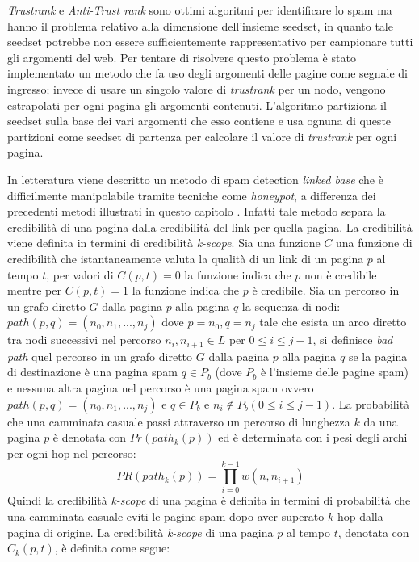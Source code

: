 \textit{Trustrank} e \textit{Anti-Trust rank} sono ottimi algoritmi per identificare lo spam ma hanno il problema relativo alla dimensione dell’insieme  seedset, in quanto tale seedset potrebbe non essere sufficientemente rappresentativo per campionare tutti gli argomenti del web. Per tentare di risolvere questo problema è stato implementato un metodo \cite{Wu:2006:TTU:1135777.1135792}  che fa uso degli argomenti delle pagine come segnale di ingresso;  invece di usare un singolo valore di \textit{trustrank} per un nodo, vengono estrapolati per ogni pagina gli argomenti contenuti. L'algoritmo partiziona il seedset sulla base dei vari argomenti che esso contiene e usa ognuna di queste partizioni come seedset di partenza per calcolare il valore di \textit{trustrank} per ogni pagina.

 In letteratura viene descritto un metodo di spam detection  \cite{Caverlee:2007:CWS:1281100.1281124} \textit{linked base} che è difficilmente manipolabile tramite tecniche come \textit{honeypot}, a differenza dei precedenti metodi illustrati in questo capitolo . Infatti tale metodo separa la credibilità di una pagina dalla credibilità del link per quella pagina. La credibilità viene definita in termini di credibilità \textit{k-scope}. Sia una funzione \(C\) una funzione di credibilità che istantaneamente valuta la qualità di un link di un pagina \(p\) al tempo \(t\), per valori di \(C(p,t)=0\) la funzione indica che \(p\) non è credibile mentre per  \(C(p,t)=1\) la funzione indica che \(p\) è credibile. Sia un percorso in un grafo diretto \(G\) dalla pagina \(p\) alla pagina \(q\) la sequenza di nodi: \(path(p,q)=(n_0,n_1,...,n_j)\) dove \(p=n_0, q=n_j\) tale che esista un arco diretto tra nodi successivi nel percorso \(n_i,n_{i+1}\in L\) per \(0\leq i \leq j-1\), si definisce \textit{bad path} quel 
percorso  in un grafo  diretto \(G\)  dalla pagina \(p\) alla pagina \(q\) se la pagina di destinazione è una pagina spam \(q\in P_b\) (dove \(P_b\) è l'insieme delle pagine spam) e nessuna altra pagina nel percorso è una pagina spam ovvero \(path(p,q)=(n_0,n_1,...,n_j)\) e \(q\in P_b\) e \(n_i\not\in P_b (0\leq i\leq j-1)\). La probabilità che una camminata casuale passi attraverso un percorso di lunghezza \(k\) da una pagina \(p\) è denotata con \(Pr(path_k(p))\) ed è determinata con i pesi degli archi per ogni hop nel percorso:
\begin{equation}
 PR(path_k(p))=\prod_{i=0}^{k-1}w(n,n_{i+1})
\end{equation}
Quindi la credibilità \textit{k-scope} di una pagina  è definita in termini di probabilità che una camminata casuale eviti le pagine spam dopo aver superato \(k\) hop dalla pagina di origine. La credibilità \textit{k-scope} di una pagina \(p\) al tempo \(t\), denotata con \(C_k(p,t)\), è definita come segue:
